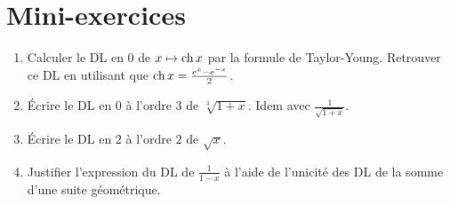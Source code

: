 \section{Mini-exercices}

\begin{frame}

\begin{miniexercice}
\begin{enumerate}
  \item Calculer le DL en $0$ de $x\mapsto \mathop{\text{ch}}\nolimits x$ par la formule de Taylor-Young.
Retrouver ce DL en utilisant que $\mathop{\text{ch}}\nolimits x = \frac{e^x-e^{-x}}{2}$.
  \item Écrire le DL en $0$ à l'ordre $3$ de $\sqrt[3]{1+x}$. Idem avec $\frac{1}{\sqrt{1+x}}$.
  \item Écrire le DL en $2$ à l'ordre $2$ de $\sqrt{x}$.
  \item Justifier l'expression du DL de $\frac{1}{1-x}$ à l'aide de l'unicité des DL 
de la somme d'une suite géométrique.
\end{enumerate}
\end{miniexercice}
\end{frame}

